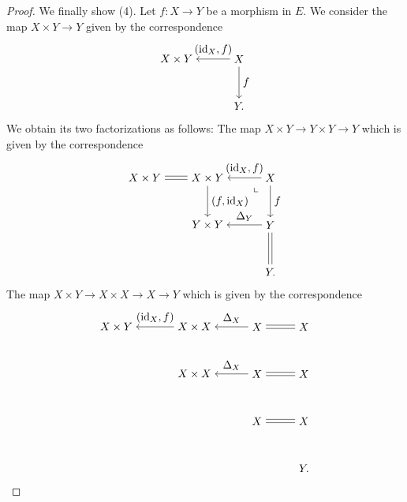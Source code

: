 \documentclass[a4paper,dvipdfmx,11pt,reqno]{amsart}
\DeclareMathOperator{\id}{id}
\theoremstyle{definition}
\begin{document}
\begin{proof}
  We finally show (4).
  Let $f : X \to Y$ be a morphism in $E$.
  We consider the map $X \times Y \to Y$ given by the correspondence
  \[\begin{tikzpicture}[auto,->]
    \node (11) at (-0.5,3) {$X \times Y$};
    \node (12) at (1.5,3) {$X$};
    \node (22) at (1.5,1.5) {$Y.$};
    \draw (12) -- node[swap] {$(\id_X,f)$} (11);
    \draw (12) -- node {$f$} (22);
  \end{tikzpicture}\]
  We obtain its two factorizations as follows:
  The map $X \times Y \to Y \times Y \to Y$ which is given by the correspondence
  \[\begin{tikzpicture}[auto]
    \node (11) at (-0.5,3) {$X \times Y$};
    \node (12) at (1.5,3) {$X \times Y$};
    \node (13) at (3.5,3) {$X$};
    \node (22) at (1.5,1.5) {$Y \times Y$};
    \node (23) at (3.5,1.5) {$Y$};
    \node (33) at (3.5,0) {$Y.$};
    \draw[transform canvas={yshift=1.5pt}] (12) -- (11);
    \draw[transform canvas={yshift=-1.5pt}] (12) -- (11);
    \draw[->] (13) -- node[swap] {$(\id_X,f)$} (12);
    \draw[->] (23) -- node[swap]{$\Delta_Y$} (22);
    \draw[->] (12) -- node {$(f,\id_X)$} (22);
    \draw[->] (13) -- node {$f$} (23);
    \draw[transform canvas={xshift=1.5pt}] (23) -- (33);
    \draw[transform canvas={xshift=-1.5pt}] (23) -- (33);
    \node at (3.1,2.6) {\rotatebox[origin=c]{90}{$\ulcorner$}};
  \end{tikzpicture}\]
  The map $X \times Y \to X \times X \to X \to Y$ which is given by the correspondence
  \[\begin{tikzpicture}[auto]
    \node (11) at (-1.5,4.5) {$X \times Y$};
    \node (12) at (1.0,4.5) {$X \times X$};
    \node (13) at (3,4.5) {$X$};
    \node (14) at (4.5,4.5) {$X$};
    \node (22) at (1.0,3) {$X \times X$};
    \node (23) at (3,3) {$X$};
    \node (24) at (4.5,3) {$X$};
    \node (33) at (3,1.5) {$X$};
    \node (34) at (4.5,1.5) {$X$};
    \node (44) at (4.5,0) {$Y.$};
    \draw[->] (12) -- node[swap] {$(\id_X,f)$} (11);
    \draw[->] (13) -- node[swap] {$\Delta_X$} (12);
    \draw[transform canvas={yshift=1.5pt}] (14) -- (13);
    \draw[transform canvas={yshift=-1.5pt}] (14) -- (13);   
    \draw[->] (23) -- node[swap] {$\Delta_X$} (22);
    \draw[transform canvas={yshift=1.5pt}] (24) -- (23);
    \draw[transform canvas={yshift=-1.5pt}] (24) -- (23);  
    \draw[transform canvas={yshift=1.5pt}] (34) -- (33);
    \draw[transform canvas={yshift=-1.5pt}] (34) -- (33);  

\end{tikzpicture}\]
\end{proof}
\end{document}
